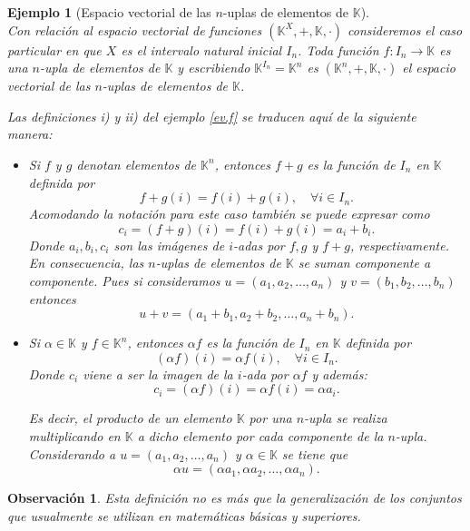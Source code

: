 \documentclass[b5paper, 11pt]{book}
\newcommand{\0}{\mathbf{0}}
\newcommand{\K}{\mathds{K}}
\newtheorem{obs}{Observación}[chapter]
\theoremstyle{estiloB}
\theoremstyle{estiloC}
\theoremstyle{estiloD}
\theoremstyle{estiloE}
\newtheorem{ejem}{Ejemplo}[chapter]
\begin{document}
\begin{ejem}[Espacio vectorial de las $n$-uplas de elementos de $\K$]\textcolor{white}{.}\\
Con relación al espacio vectorial de funciones $(\K^{X}, +, \K, \cdot)$ consideremos el caso particular en que $X$ es el intervalo natural inicial $I_{n}$. Toda función $f: I_{n} \to \K$ es una $n$-upla de elementos de $\K$ y escribiendo $\K^{I_n}= \K^{n}$ es $(\K^{n}, +, \K, \cdot)$ el espacio vectorial de las $n$-uplas de elementos de $\K$.

Las definiciones \textit{i)} y \textit{ii)} del ejemplo \ref{ev.f} se traducen aquí de la siguiente manera:

\begin{itemize}
\item[\textit{i)}] Si $f$ y $g$ denotan elementos de $\K^{n}$, entonces $f+g$ es la función de $I_n$ en $\K$ definida por
\[ f+g(i)= f(i)+ g(i), \quad \forall i \in I_n. \]
Acomodando la notación para este caso también se puede expresar como
\[ c_i= (f+g)(i)= f(i)+ g(i)= a_i + b_i. \]
Donde $a_i, b_i, c_i$ son las imágenes de $i$-adas por $f,g$ y $f+g$, respectivamente. En consecuencia, las $n$-uplas de elementos de $\K$ se suman componente a componente. Pues si consideramos $u= (a_1, a_2, \ldots , a_n)$ y $v= (b_1, b_2, \ldots , b_n)$ entonces
\[ u+v= (a_1 + b_1, a_2 + b_2, \ldots , a_n + b_n). \]

\item[\textit{ii)}] Si $\alpha \in \K$ y $f \in \K^{n}$, entonces $\alpha f$ es la función de $I_n$ en $\K$ definida por
\[ (\alpha f)(i)= \alpha f(i), \quad \forall i \in I_n. \]
Donde $c_i$ viene a ser la imagen de la $i$-ada por $\alpha f$ y además:
\[ c_i = (\alpha f)(i)= \alpha f(i)= \alpha a_i. \]

Es decir, el producto de un elemento $\K$ por una $n$-upla se realiza multiplicando en $\K$ a dicho elemento por cada componente de la $n$-upla. Considerando a $u= (a_1, a_2, \ldots , a_n)$ y $\alpha \in \K$ se tiene que
\[ \alpha u= (\alpha a_1,\alpha a_2, \ldots , \alpha a_n). \] 
\end{itemize}
\end{ejem}

\begin{obs}
Esta definición no es más que la generalización de los conjuntos que usualmente se utilizan en matemáticas básicas y superiores.
\end{obs}
\end{document}
